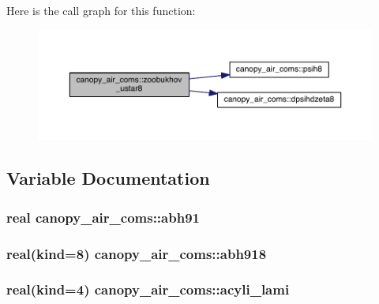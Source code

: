 Here is the call graph for this function\+:\nopagebreak
\begin{figure}[H]
\begin{center}
\leavevmode
\includegraphics[width=350pt]{namespacecanopy__air__coms_a6ef582f46fded1355973730e6a2289f2_cgraph}
\end{center}
\end{figure}




\subsection{Variable Documentation}
\hypertarget{namespacecanopy__air__coms_a8943107817bd72a2ecf2c8ac35516efc}{}
\subsubsection[{abh91}]{\setlength{\rightskip}{0pt plus 5cm}real canopy\+\_\+air\+\_\+coms\+::abh91}\label{namespacecanopy__air__coms_a8943107817bd72a2ecf2c8ac35516efc}
\hypertarget{namespacecanopy__air__coms_a7bbc194838f911d2e8b0948159f4d62e}{}
\subsubsection[{abh918}]{\setlength{\rightskip}{0pt plus 5cm}real(kind=8) canopy\+\_\+air\+\_\+coms\+::abh918}\label{namespacecanopy__air__coms_a7bbc194838f911d2e8b0948159f4d62e}
\hypertarget{namespacecanopy__air__coms_a910e0e75420e6cd46075062c7da2b565}{}
\subsubsection[{acyli\+\_\+lami}]{\setlength{\rightskip}{0pt plus 5cm}real(kind=4) canopy\+\_\+air\+\_\+coms\+::acyli\+\_\+lami}\label{namespacecanopy__air__coms_a910e0e75420e6cd46075062c7da2b565}
\hypertarget{namespacecanopy__air__coms_a325f601d72eb729cc4301008156be76b}{}
